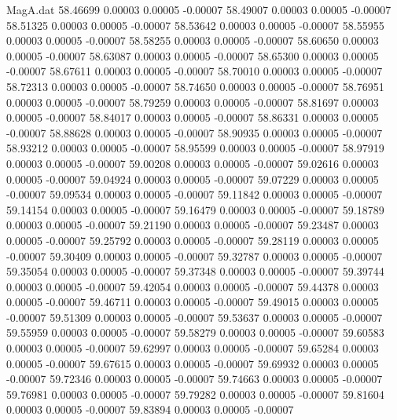 \begin{filecontents}{MagA.dat}
  58.46699    0.00003    0.00005   -0.00007
  58.49007    0.00003    0.00005   -0.00007
  58.51325    0.00003    0.00005   -0.00007
  58.53642    0.00003    0.00005   -0.00007
  58.55955    0.00003    0.00005   -0.00007
  58.58255    0.00003    0.00005   -0.00007
  58.60650    0.00003    0.00005   -0.00007
  58.63087    0.00003    0.00005   -0.00007
  58.65300    0.00003    0.00005   -0.00007
  58.67611    0.00003    0.00005   -0.00007
  58.70010    0.00003    0.00005   -0.00007
  58.72313    0.00003    0.00005   -0.00007
  58.74650    0.00003    0.00005   -0.00007
  58.76951    0.00003    0.00005   -0.00007
  58.79259    0.00003    0.00005   -0.00007
  58.81697    0.00003    0.00005   -0.00007
  58.84017    0.00003    0.00005   -0.00007
  58.86331    0.00003    0.00005   -0.00007
  58.88628    0.00003    0.00005   -0.00007
  58.90935    0.00003    0.00005   -0.00007
  58.93212    0.00003    0.00005   -0.00007
  58.95599    0.00003    0.00005   -0.00007
  58.97919    0.00003    0.00005   -0.00007
  59.00208    0.00003    0.00005   -0.00007
  59.02616    0.00003    0.00005   -0.00007
  59.04924    0.00003    0.00005   -0.00007
  59.07229    0.00003    0.00005   -0.00007
  59.09534    0.00003    0.00005   -0.00007
  59.11842    0.00003    0.00005   -0.00007
  59.14154    0.00003    0.00005   -0.00007
  59.16479    0.00003    0.00005   -0.00007
  59.18789    0.00003    0.00005   -0.00007
  59.21190    0.00003    0.00005   -0.00007
  59.23487    0.00003    0.00005   -0.00007
  59.25792    0.00003    0.00005   -0.00007
  59.28119    0.00003    0.00005   -0.00007
  59.30409    0.00003    0.00005   -0.00007
  59.32787    0.00003    0.00005   -0.00007
  59.35054    0.00003    0.00005   -0.00007
  59.37348    0.00003    0.00005   -0.00007
  59.39744    0.00003    0.00005   -0.00007
  59.42054    0.00003    0.00005   -0.00007
  59.44378    0.00003    0.00005   -0.00007
  59.46711    0.00003    0.00005   -0.00007
  59.49015    0.00003    0.00005   -0.00007
  59.51309    0.00003    0.00005   -0.00007
  59.53637    0.00003    0.00005   -0.00007
  59.55959    0.00003    0.00005   -0.00007
  59.58279    0.00003    0.00005   -0.00007
  59.60583    0.00003    0.00005   -0.00007
  59.62997    0.00003    0.00005   -0.00007
  59.65284    0.00003    0.00005   -0.00007
  59.67615    0.00003    0.00005   -0.00007
  59.69932    0.00003    0.00005   -0.00007
  59.72346    0.00003    0.00005   -0.00007
  59.74663    0.00003    0.00005   -0.00007
  59.76981    0.00003    0.00005   -0.00007
  59.79282    0.00003    0.00005   -0.00007
  59.81604    0.00003    0.00005   -0.00007
  59.83894    0.00003    0.00005   -0.00007

\end{filecontents}
